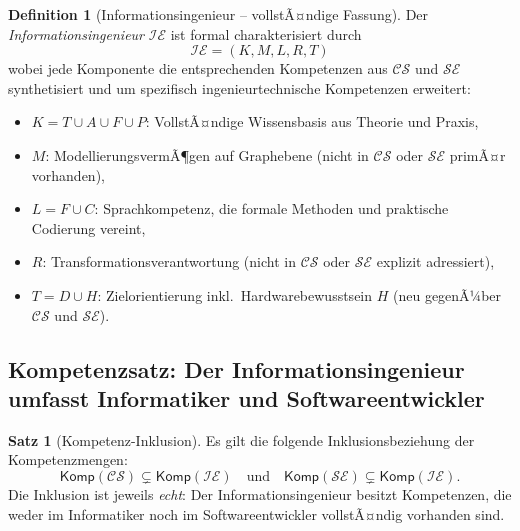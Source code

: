 ﻿\documentclass[a4paper,12pt]{report}
\theoremstyle{definition}
\newtheorem{definition}{Definition}[section]
\newtheorem{satz}{Satz}[section]
\begin{document}
\begin{definition}[Informationsingenieur -- vollstÃ¤ndige Fassung]
\label{def:infeng2}
Der \emph{Informationsingenieur} $\mathcal{IE}$ ist formal charakterisiert durch
\[
  \mathcal{IE} = (K, M, L, R, T)
\]
wobei jede Komponente die entsprechenden Kompetenzen aus $\mathcal{CS}$ und
$\mathcal{SE}$ synthetisiert und um spezifisch ingenieurtechnische Kompetenzen erweitert:
\begin{itemize}
  \item $K = T \cup A \cup F \cup P$: VollstÃ¤ndige Wissensbasis aus Theorie und Praxis,
  \item $M$: ModellierungsvermÃ¶gen auf Graphebene (nicht in $\mathcal{CS}$ oder $\mathcal{SE}$
        primÃ¤r vorhanden),
  \item $L = F \cup C$: Sprachkompetenz, die formale Methoden und praktische Codierung vereint,
  \item $R$: Transformationsverantwortung (nicht in $\mathcal{CS}$ oder $\mathcal{SE}$
        explizit adressiert),
  \item $T = D \cup H$: Zielorientierung inkl.\ Hardwarebewusstsein $H$ (neu gegenÃ¼ber $\mathcal{CS}$
        und $\mathcal{SE}$).
\end{itemize}
\end{definition}

\subsection{Kompetenzsatz: Der Informationsingenieur umfasst Informatiker und Softwareentwickler}

\begin{satz}[Kompetenz-Inklusion]
\label{satz:inklusion}
Es gilt die folgende Inklusionsbeziehung der Kompetenzmengen:
\[
  \mathsf{Komp}(\mathcal{CS}) \subsetneq \mathsf{Komp}(\mathcal{IE})
  \quad \text{und} \quad
  \mathsf{Komp}(\mathcal{SE}) \subsetneq \mathsf{Komp}(\mathcal{IE}).
\]
Die Inklusion ist jeweils \emph{echt}: Der Informationsingenieur besitzt Kompetenzen,
die weder im Informatiker noch im Softwareentwickler vollstÃ¤ndig vorhanden sind.
\end{satz}
\end{document}
